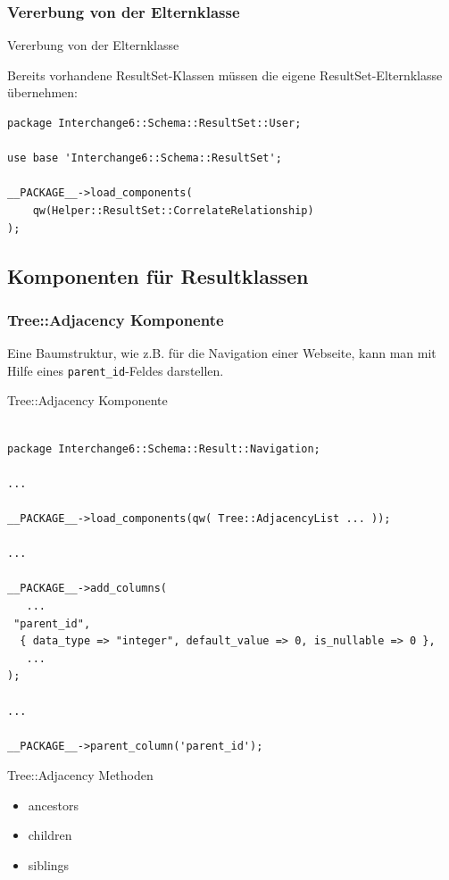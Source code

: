 \subsubsection{Vererbung von der Elternklasse}
\begin{frame}[fragile]{Vererbung von der Elternklasse}

Bereits vorhandene ResultSet-Klassen müssen die eigene
ResultSet-Elternklasse übernehmen:

\begin{lstlisting}
package Interchange6::Schema::ResultSet::User;

use base 'Interchange6::Schema::ResultSet';

__PACKAGE__->load_components(
    qw(Helper::ResultSet::CorrelateRelationship)
);
\end{lstlisting}
\end{frame}

\subsection{Komponenten für Resultklassen}

\subsubsection{Tree::Adjacency Komponente}

Eine Baumstruktur, wie z.B. für die Navigation einer
Webseite, kann man mit Hilfe eines \verb|parent_id|-Feldes
darstellen.

\begin{frame}[fragile]{Tree::Adjacency Komponente}
\begin{lstlisting}

package Interchange6::Schema::Result::Navigation;

...

__PACKAGE__->load_components(qw( Tree::AdjacencyList ... ));

...

__PACKAGE__->add_columns(
   ...
 "parent_id",
  { data_type => "integer", default_value => 0, is_nullable => 0 },
   ...
);

...

__PACKAGE__->parent_column('parent_id');

\end{lstlisting}
\end{frame}

\begin{frame}{Tree::Adjacency Methoden}
\begin{itemize}
\item ancestors
\item children
\item siblings
\end{itemize}
\end{frame}

